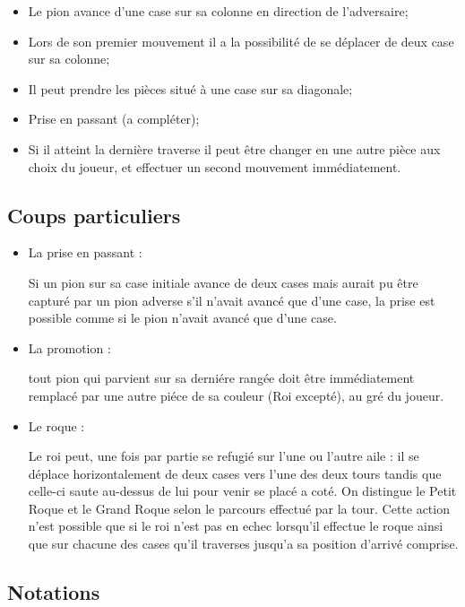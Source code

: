 \documentclass[12pt]{article}
\begin{document}
\begin{itemize}
  \begin{itemize}
  \itemsep1pt\parskip0pt
  \item
    Le pion avance d'une case sur sa colonne en direction de
    l'adversaire;
  \item
    Lors de son premier mouvement il a la possibilité de se déplacer de
    deux case sur sa colonne;
  \item
    Il peut prendre les pièces situé à une case sur sa diagonale;
  \item
    Prise en passant (a compléter);
  \item
    Si il atteint la dernière traverse il peut être changer en une autre
    pièce aux choix du joueur, et effectuer un second mouvement
    immédiatement.
  \end{itemize}
\end{itemize}

\subsection{Coups particuliers}\label{coups-particuliers}

\begin{itemize}
\item
  La prise en passant :

  Si un pion sur sa case initiale avance de deux cases mais aurait pu
  être capturé par un pion adverse s'il n'avait avancé que d'une case,
  la prise est possible comme si le pion n'avait avancé que d'une case.
\item
  La promotion :

  tout pion qui parvient sur sa derniére rangée doit être immédiatement
  remplacé par une autre piéce de sa couleur (Roi excepté), au gré du
  joueur.
\item
  Le roque :

  Le roi peut, une fois par partie se refugié sur l'une ou l'autre aile
  : il se déplace horizontalement de deux cases vers l'une des deux
  tours tandis que celle-ci saute au-dessus de lui pour venir se placé a
  coté. On distingue le Petit Roque et le Grand Roque selon le parcours
  effectué par la tour. Cette action n'est possible que si le roi n'est
  pas en echec lorsqu'il effectue le roque ainsi que sur chacune des
  cases qu'il traverses jusqu'a sa position d'arrivé comprise.
\end{itemize}

\subsection{Notations}\label{notations}
\end{document}
